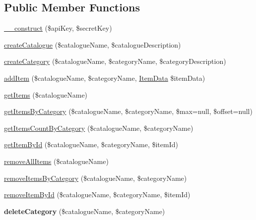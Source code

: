 \subsection*{Public Member Functions}
\begin{DoxyCompactItemize}
\item 
\hyperlink{class_catalogue_service_a49f2ad222e06420736d750e167d55d7c}{\+\_\+\+\_\+construct} (\$api\+Key, \$secret\+Key)
\item 
\hyperlink{class_catalogue_service_a4e6acaab503733ea964ca81e729710b4}{create\+Catalogue} (\$catalogue\+Name, \$catalogue\+Description)
\item 
\hyperlink{class_catalogue_service_ac2e858576186ea350fa9f30fdd8b72fe}{create\+Category} (\$catalogue\+Name, \$category\+Name, \$category\+Description)
\item 
\hyperlink{class_catalogue_service_a9c8281af7e60514137e51b878c6c6f54}{add\+Item} (\$catalogue\+Name, \$category\+Name, \hyperlink{class_item_data}{Item\+Data} \$item\+Data)
\item 
\hyperlink{class_catalogue_service_a1d518446c7a5fdc91a6709b0a6d6fefc}{get\+Items} (\$catalogue\+Name)
\item 
\hyperlink{class_catalogue_service_a4b7d5d51e6b08177651e6a0b1a16c10b}{get\+Items\+By\+Category} (\$catalogue\+Name, \$category\+Name, \$max=null, \$offset=null)
\item 
\hyperlink{class_catalogue_service_ad94bd71cb796d8eb33811bad3f35c418}{get\+Items\+Count\+By\+Category} (\$catalogue\+Name, \$category\+Name)
\item 
\hyperlink{class_catalogue_service_aac043f1aed5e0ac36f7c59a233ae7309}{get\+Item\+By\+Id} (\$catalogue\+Name, \$category\+Name, \$item\+Id)
\item 
\hyperlink{class_catalogue_service_a89ad971ed81bc3b521626e29c59700a4}{remove\+All\+Items} (\$catalogue\+Name)
\item 
\hyperlink{class_catalogue_service_a8a1ffbb39e02f920ee27b209098ac63d}{remove\+Items\+By\+Category} (\$catalogue\+Name, \$category\+Name)
\item 
\hyperlink{class_catalogue_service_af70a701a86e1d1ac7a612498ed661ee0}{remove\+Item\+By\+Id} (\$catalogue\+Name, \$category\+Name, \$item\+Id)
\item 
\hypertarget{class_catalogue_service_a166ae7b84def7b8382fed1406547f081}{{\bfseries delete\+Category} (\$catalogue\+Name, \$category\+Name)}\label{class_catalogue_service_a166ae7b84def7b8382fed1406547f081}

\end{DoxyCompactItemize}
